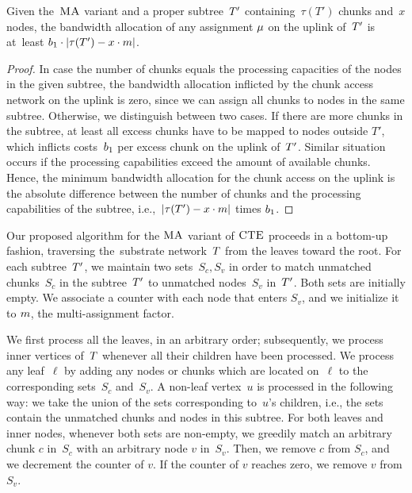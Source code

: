 

\begin{lemma}\label{lem:uplink-alloc}
Given the~$\textsc{MA}$ variant and a proper subtree~$T'$
containing~$\tau(T')$
chunks and~$x$ nodes, the bandwidth allocation of any
assignment
$\mu$ on the uplink of~$T'$ is at~least $b_1\cdot|\tau(T')-x\cdot m|$.
\label{lemma:uplink}
\end{lemma}
\begin{proof}
In case the number of chunks equals the processing capacities of the
nodes in the given subtree,
the bandwidth allocation inflicted by the chunk access network on the uplink is zero, since we can assign all chunks to nodes in the same subtree.
Otherwise, we distinguish between two cases. If there are more chunks in the subtree, at least all excess chunks have to
be mapped to nodes outside $T'$, which 
inflicts costs~$b_1$ per excess chunk on the uplink of~$T'$.
 Similar situation occurs if the processing capabilities exceed the
amount of
available chunks.
Hence, the minimum bandwidth allocation for the chunk access on the uplink
is the absolute difference between the number of chunks and the processing capabilities
of the subtree, i.e.,~$|\tau(T')-x\cdot m|$ times $b_1$.
\end{proof}


 Our proposed algorithm for the $\textsc{MA}$ variant of $\textsc{CTE}$
proceeds in a bottom-up fashion, traversing the~substrate network~$T$
from the leaves toward the root.
For each subtree~$T'$, we maintain
two sets~$S_c,S_v$ in order to match unmatched
chunks~$S_c$ in the subtree~$T'$ to unmatched
nodes~$S_v$ in~$T'$. Both sets are initially empty.
We associate a counter with each node that enters $S_v$, and we initialize it to $m$, the multi-assignment factor.


We first process all the leaves, in an arbitrary order; subsequently, we process inner vertices
of~$T$ whenever all their children have been processed.
We process any leaf~$\ell$
by adding any
nodes or chunks which are located on~$\ell$ to the corresponding sets~$S_c$ and~$S_v$.
A non-leaf vertex~$u$ is processed in the following way: we take the union of
the sets corresponding to~$u$'s children, i.e., the sets contain the unmatched chunks and nodes
in this subtree.
For both leaves and inner nodes, whenever
both sets are non-empty, we greedily match an arbitrary chunk $c$ in~$S_c$ with an arbitrary node $v$ in~$S_v$.
Then, we remove $c$ from $S_c$, and we decrement the counter of $v$. If the counter of $v$ reaches zero, we remove $v$ from $S_v$.

